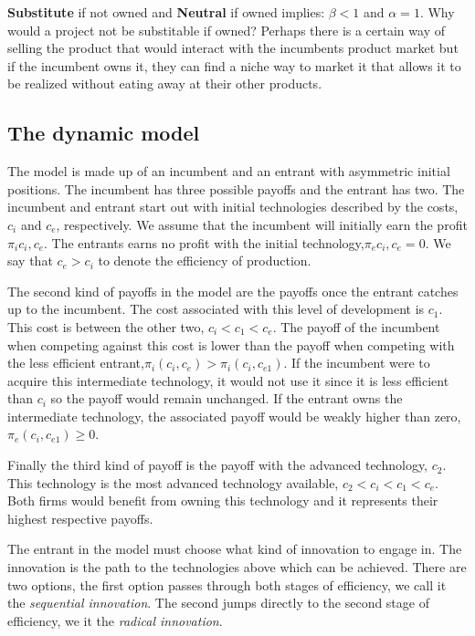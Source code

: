 \textbf{Substitute} if not owned and \textbf{Neutral} if owned implies: $\beta<1$ and $\alpha=1$. Why would a project not be substitable if owned? Perhaps there is a certain way of selling the product that would interact with the incumbents product market but if the incumbent owns it, they can find a niche way to market it that allows it to be realized without eating away at their other products.


\subsection{The dynamic model}\label{dynamic}

The model is made up of an incumbent and an entrant with asymmetric initial positions. The incumbent has three possible payoffs and the entrant has two. The incumbent and entrant start out with initial technologies described by the costs, $c_i$ and $c_e$, respectively. We assume that the incumbent will initially earn the profit $\pi_i{c_i,c_e}$. The entrants earns no profit with the initial technology,$\pi_e{c_i,c_e}=0$. We say that $c_e>c_i$ to denote the efficiency of production. 

The second kind of payoffs in the model are the payoffs once the entrant catches up to the incumbent. The cost associated with this level of development is $c_{1}$. This cost is between the other two, $c_i<c_{1}<c_e$. The payoff of the incumbent when competing against this cost is lower than the payoff when competing with the less efficient entrant,$ \pi_i( c_i,c_{e}) > \pi_i( c_i, c_{e1} )$. If the incumbent were to acquire this intermediate technology, it would not use it since it is less efficient than $c_i$ so the payoff would remain unchanged. If the entrant owns the intermediate technology, the associated payoff would be weakly higher than zero, $\pi_e(c_i,c_{e1}) \geq 0$.

Finally the third kind of payoff is the payoff with the advanced technology, $c_2$. This technology is the most advanced technology available, $c_2<c_i<c_1<c_e$. Both firms would benefit from owning this technology and it represents their highest respective payoffs. 

The entrant in the model must choose what kind of innovation to engage in. The innovation is the path to the technologies above which can be achieved. There are two options, the first option passes through both stages of efficiency, we call it the \textit{sequential innovation}. The second jumps directly to the second stage of efficiency, we it the \textit{radical innovation}.  

